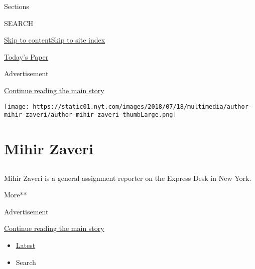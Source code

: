 Sections

SEARCH

\protect\hyperlink{site-content}{Skip to
content}\protect\hyperlink{site-index}{Skip to site index}

\href{https://myaccount.nytimes.com/auth/login?response_type=cookie\&client_id=vi}{}

\href{https://www.nytimes.com/section/todayspaper}{Today's Paper}

Advertisement

\protect\hyperlink{after-top}{Continue reading the main story}

\texttt{[image: https://static01.nyt.com/images/2018/07/18/multimedia/author-mihir-zaveri/author-mihir-zaveri-thumbLarge.png]}

\hypertarget{mihir-zaveri}{%
\section{Mihir Zaveri}\label{mihir-zaveri}}

\subsection{}

Mihir Zaveri is a general assignment reporter on the Express Desk in New
York.

More**

Advertisement

\protect\hyperlink{after-mid1}{Continue reading the main story}

\begin{itemize}
\tightlist
\item
  \protect\hyperlink{stream-panel}{Latest}
\item
  Search
\end{itemize}

